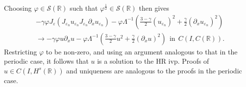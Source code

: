 \documentclass{beamer}
\newcommand{\rr}{\mathbb{R}}
\newcommand{\p}{\partial}
\newcommand{\ee}{\varepsilon}
\newcommand{\vp}{\varphi}
\begin{document}
\begin{frame}

Choosing $\vp \in \mathcal{S}(\rr)$ such that
$\vp^\frac{1}{2} \in \mathcal{S}(\rr)$ then gives 
%
%
%
\begin{equation*}
\begin{split}
	& -\gamma \vp J_\ee (J_{\ee_n} u_{\ee_n} 
J_{\ee_n} \p_x u_{\ee_n}) - \vp \Lambda^{-1} \left( \frac{3-\gamma}{2}
(u_{\ee_n})^2
+ \frac{\gamma}{2} (\p_x u_{\ee_n})^2 \right )
\\
& \to -\gamma \vp u \p_x u - \vp \Lambda^{-1} \left( \frac{3-\gamma}{2} u^2
+ \frac{\gamma}{2} (\p_x u)^2 \right ) \ \
\text{in} \ \ C(I, C(\rr)).
\label{llnon-local-convergence}
\end{split}
\end{equation*}
%
%
%
Restricting $\vp$ to be non-zero, and using an argument analogous to that 
in the periodic case, it follows that 
$u$ is a solution to the HR ivp. Proofs of 
$u \in C(I, H^s(\rr))$ and uniqueness are analogous to the proofs in 
the periodic case.
%
%
\end{frame}
\end{document}
